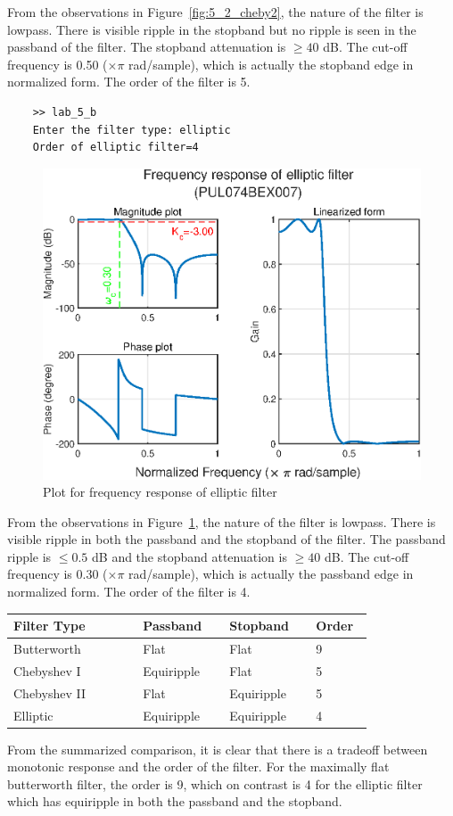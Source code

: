 \documentclass{lab_sheet}
\begin{document}
From the observations in Figure~\ref{fig:5_2_cheby2}, the nature of the filter is lowpass. There is visible ripple in the stopband but no ripple is seen in the passband of the filter. The stopband attenuation is $\geq40$ dB. The cut-off frequency is 0.50 ($\times \pi$ rad/sample), which is actually the stopband edge in normalized form. The order of the filter is 5. 
\pagebreak
{}
\begin{verbatim}
    >> lab_5_b
    Enter the filter type: elliptic
    Order of elliptic filter=4
\end{verbatim}
\begin{figure}[H]
    \centering
    \includegraphics[width=0.9\linewidth]{../Figures/elliptic.eps}
    \caption{Plot for frequency response of elliptic filter}
    \label{fig:5_2_ellip}
\end{figure}
From the observations in Figure~\ref{fig:5_2_ellip}, the nature of the filter is lowpass. There is visible ripple in both the passband and the stopband of the filter. The passband ripple is $\leq0.5$ dB and the stopband attenuation is $\geq40$ dB. The cut-off frequency is 0.30 ($\times \pi$ rad/sample), which is actually the passband edge in normalized form. The order of the filter is 4. 
\begin{table}[H]
    \centering
    \begin{tabular}{|m{0.3\linewidth}||m{0.2\linewidth}||m{0.2\linewidth}||m{0.1\linewidth}|}
        \hline
        \textbf{Filter Type}&\textbf{Passband}&\textbf{Stopband}&\textbf{Order}\\\hline\hline
        Butterworth&Flat&Flat&9\\\hline
        Chebyshev I&Equiripple&Flat&5\\\hline
        Chebyshev II&Flat&Equiripple&5\\\hline
        Elliptic&Equiripple&Equiripple&4\\\hline
    \end{tabular}
\end{table}
From the summarized comparison, it is clear that there is a tradeoff between monotonic response and the order of the filter. For the maximally flat butterworth filter, the order is 9, which on contrast is 4 for the elliptic filter which has equiripple in both the passband and the stopband.
\end{document}

